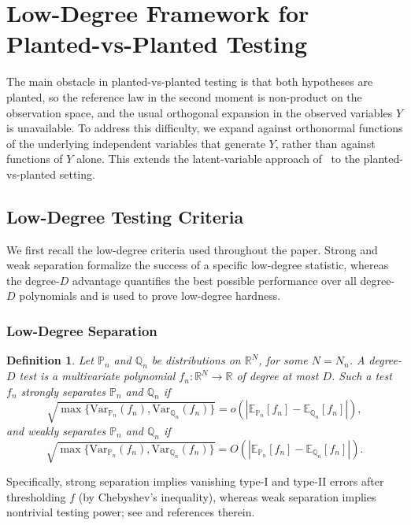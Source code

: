 \documentclass[11pt, letterpaper]{article}
\newtheorem{definition}[theorem]{Definition}
\numberwithin{equation}{section}
\newcommand{\E}{\mathbb{E}}
\newcommand{\PP}{\mathbb{P}}
\newcommand{\QQ}{\mathbb{Q}}
\begin{document}
\section{Low-Degree Framework for Planted-vs-Planted Testing}\label{sec:framework}
 The main obstacle in planted-vs-planted testing is that both hypotheses are planted, so the reference law in the second moment is non-product on the observation space, and the usual orthogonal expansion in the observed variables $Y$ is unavailable. To address this difficulty, we expand against orthonormal functions of the underlying independent variables that generate $Y$, rather than against functions of $Y$ alone. This extends the latent-variable approach of~\cite{sohn2025sharp} to the planted-vs-planted setting.
\subsection{Low-Degree Testing Criteria}
We first recall the low-degree criteria used throughout the paper. Strong and weak separation formalize the success of a specific low-degree statistic, whereas the degree-$D$ advantage quantifies the best possible performance over all degree-$D$ polynomials and is used to prove low-degree hardness.
\subsubsection{Low-Degree Separation}
\begin{definition}
Let $\PP_n$ and $\QQ_n$ be distributions on $\mathbb R^N$, for some $N=N_n$. A degree-$D$ test is a multivariate polynomial $f_n: \mathbb R^N\to\mathbb R$ of degree at most $D$. Such a test $f_n$ strongly separates $\PP_n$ and
$\QQ_n$ if
\[
\sqrt{\max\{\mathrm{Var}_{\PP_n}(f_n),\mathrm{Var}_{\QQ_n}(f_n)\}}
=o\left(\left|\E_{\PP_n}[f_n]-\E_{\QQ_n}[f_n]\right|\right),
\]
and weakly separates $\PP_n$ and $\QQ_n$ if
\[
\sqrt{\max\{\mathrm{Var}_{\PP_n}(f_n),\mathrm{Var}_{\QQ_n}(f_n)\}}
=O\left(\left|\E_{\PP_n}[f_n]-\E_{\QQ_n}[f_n]\right|\right).
\]
\end{definition}
Specifically, strong separation implies vanishing type-I and type-II errors after thresholding $f$ (by Chebyshev's inequality), whereas weak separation implies nontrivial testing power; see
\cite{bandeira2022franz,coja2022statistical} 
and references therein.
\end{document}
